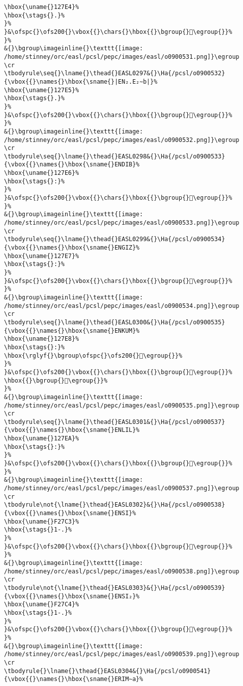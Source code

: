 \begin{verbatim}
\hbox{\uname{}127E4}%
\hbox{\stags{}.}%
}%
}&\ofspc{}\ofs200{}\vbox{{}\chars{}\hbox{{}\bgroup{}𒟤\egroup{}}%
}%
&{}\bgroup\imageinline{}\texttt{[image: /home/stinney/orc/easl/pcsl/pepc/images/easl/o0900531.png]}\egroup
\cr
\tbodyrule\seq{}\lname{}\thead{}EASL0297&{}\Ha{/pcsl/o0900532}{\vbox{{}\names{}\hbox{\sname{}|EN₂.E₂∼b|}%
\hbox{\uname{}127E5}%
\hbox{\stags{}.}%
}%
}&\ofspc{}\ofs200{}\vbox{{}\chars{}\hbox{{}\bgroup{}𒟥\egroup{}}%
}%
&{}\bgroup\imageinline{}\texttt{[image: /home/stinney/orc/easl/pcsl/pepc/images/easl/o0900532.png]}\egroup
\cr
\tbodyrule\seq{}\lname{}\thead{}EASL0298&{}\Ha{/pcsl/o0900533}{\vbox{{}\names{}\hbox{\sname{}ENDIB}%
\hbox{\uname{}127E6}%
\hbox{\stags{}:}%
}%
}&\ofspc{}\ofs200{}\vbox{{}\chars{}\hbox{{}\bgroup{}𒟦\egroup{}}%
}%
&{}\bgroup\imageinline{}\texttt{[image: /home/stinney/orc/easl/pcsl/pepc/images/easl/o0900533.png]}\egroup
\cr
\tbodyrule\seq{}\lname{}\thead{}EASL0299&{}\Ha{/pcsl/o0900534}{\vbox{{}\names{}\hbox{\sname{}ENGIZ}%
\hbox{\uname{}127E7}%
\hbox{\stags{}:}%
}%
}&\ofspc{}\ofs200{}\vbox{{}\chars{}\hbox{{}\bgroup{}𒟧\egroup{}}%
}%
&{}\bgroup\imageinline{}\texttt{[image: /home/stinney/orc/easl/pcsl/pepc/images/easl/o0900534.png]}\egroup
\cr
\tbodyrule\seq{}\lname{}\thead{}EASL0300&{}\Ha{/pcsl/o0900535}{\vbox{{}\names{}\hbox{\sname{}ENKUM}%
\hbox{\uname{}127E8}%
\hbox{\stags{}:}%
\hbox{\rglyf{}\bgroup\ofspc{}\ofs200{}𒟨\egroup{}}%
}%
}&\ofspc{}\ofs200{}\vbox{{}\chars{}\hbox{{}\bgroup{}𒟨\egroup{}}%
\hbox{{}\bgroup{}𒟩\egroup{}}%
}%
&{}\bgroup\imageinline{}\texttt{[image: /home/stinney/orc/easl/pcsl/pepc/images/easl/o0900535.png]}\egroup
\cr
\tbodyrule\seq{}\lname{}\thead{}EASL0301&{}\Ha{/pcsl/o0900537}{\vbox{{}\names{}\hbox{\sname{}ENLIL}%
\hbox{\uname{}127EA}%
\hbox{\stags{}:}%
}%
}&\ofspc{}\ofs200{}\vbox{{}\chars{}\hbox{{}\bgroup{}𒟪\egroup{}}%
}%
&{}\bgroup\imageinline{}\texttt{[image: /home/stinney/orc/easl/pcsl/pepc/images/easl/o0900537.png]}\egroup
\cr
\tbodyrule\not{\lname{}\thead{}EASL0302}&{}\Ha{/pcsl/o0900538}{\vbox{{}\names{}\hbox{\sname{}ENSI}%
\hbox{\uname{}F27C3}%
\hbox{\stags{}1-.}%
}%
}&\ofspc{}\ofs200{}\vbox{{}\chars{}\hbox{{}\bgroup{}󲟃\egroup{}}%
}%
&{}\bgroup\imageinline{}\texttt{[image: /home/stinney/orc/easl/pcsl/pepc/images/easl/o0900538.png]}\egroup
\cr
\tbodyrule\not{\lname{}\thead{}EASL0303}&{}\Ha{/pcsl/o0900539}{\vbox{{}\names{}\hbox{\sname{}ENSI₂}%
\hbox{\uname{}F27C4}%
\hbox{\stags{}1-.}%
}%
}&\ofspc{}\ofs200{}\vbox{{}\chars{}\hbox{{}\bgroup{}󲟄\egroup{}}%
}%
&{}\bgroup\imageinline{}\texttt{[image: /home/stinney/orc/easl/pcsl/pepc/images/easl/o0900539.png]}\egroup
\cr
\tbodyrule{}\lname{}\thead{}EASL0304&{}\Ha{/pcsl/o0900541}{\vbox{{}\names{}\hbox{\sname{}ERIM∼a}%

\end{verbatim}
